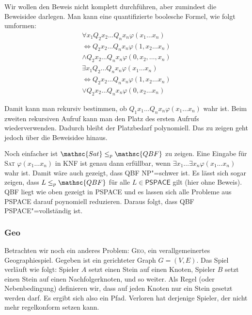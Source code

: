 \begin{Bew}
  \hspace{\parindent}Wir wollen den Beweis nicht komplett durchführen, aber zumindest die Beweisidee darlegen. Man kann eine quantifizierte boolesche Formel, wie folgt umformen:
  \begin{multline*}
    \forall x_1 Q_2 x_2 \ldots Q_n x_n \varphi (x_1 \ldots x_n) \\
    \Leftrightarrow Q_2 x_2 \ldots Q_n x_n \varphi(1, x_2 \ldots x_n) \\ \wedge Q_2 x_2 \ldots Q_n x_n \varphi(0, x_2, \ldots, x_n)
  \end{multline*}
  \begin{multline*}
    \exists x_1 Q_2 \ldots Q_n x_n \varphi(x_1 \ldots x_n) \\
    \Leftrightarrow Q_2 x_2 \ldots Q_n x_n \varphi (1, x_2 \ldots x_n) \\ \vee Q_2 x_2 \ldots Q_n x_n \varphi(0, x_2 \ldots x_n)
  \end{multline*}
  
  Damit kann man rekursiv bestimmen, ob $Q_1 x_1 \ldots Q_n x_n \varphi(x_1 \ldots x_n)$ wahr ist. Beim zweiten rekursiven Aufruf kann man den Platz des ersten Aufrufs wiederverwenden. Dadurch bleibt der Platzbedarf polynomiell. Das zu zeigen geht jedoch über die Beweisidee hinaus.
\end{Bew}

Noch einfacher ist $\mathsc{Sat} \le_p \mathsc{QBF}$ zu zeigen. Eine Eingabe für \textsc{Sat} $\varphi(x_1 \ldots x_n)$ in KNF ist genau dann erfüllbar, wenn $\exists x_1 \ldots \exists x_n \varphi(x_1 \ldots x_n)$ wahr ist. Damit wäre auch gezeigt, dass \textsc{QBF} \textsf{NP}"=schwer ist. Es lässt sich sogar zeigen, dass $L \le_p \mathsc{QBF}$ für alle $L \in \mathsf{PSPACE}$ gilt (hier ohne Beweis). \textsc{QBF} liegt wie oben gezeigt in \textsf{PSPACE} und es lassen sich alle Probleme aus \textsf{PSPACE} darauf poynomiell reduzieren. Daraus folgt, dass \textsc{QBF} \textsf{PSPACE}"=vollständig ist.

\subsubsection{Geo}
Betrachten wir noch ein anderes Problem: \textsc{Geo}, ein verallgemeinertes Geographiespiel. Gegeben ist ein gerichteter Graph $G=(V,E)$. Das Spiel verläuft wie folgt: Spieler $A$ setzt einen Stein auf einen Knoten, Spieler $B$ setzt einen Stein auf einen Nachfolgerknoten, und so weiter. Als Regel (oder Nebenbedingung) definieren wir, dass auf jeden Knoten nur ein Stein gesetzt werden darf. Es ergibt sich also ein Pfad. Verloren hat derjenige Spieler, der nicht mehr regelkonform setzen kann.

